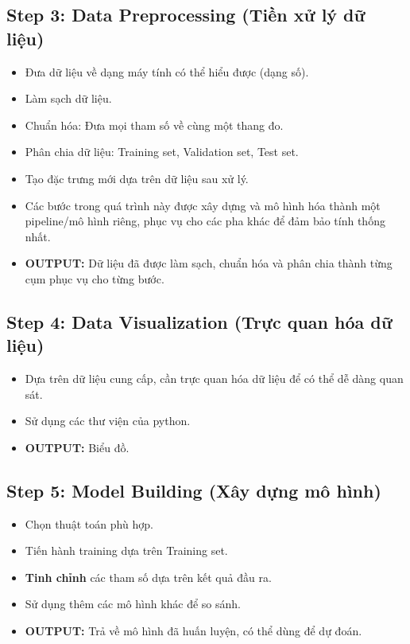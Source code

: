 \subsection{Step 3: Data Preprocessing (Tiền xử lý dữ liệu)}
\begin{itemize}
    \item Đưa dữ liệu về dạng máy tính có thể hiểu được (dạng số).
    \item Làm sạch dữ liệu.
    \item Chuẩn hóa: Đưa mọi tham số về cùng một thang đo.
    \item Phân chia dữ liệu: Training set, Validation set, Test set.
    \item Tạo đặc trưng mới dựa trên dữ liệu sau xử lý.
    \item Các bước trong quá trình này được xây dựng và mô hình hóa thành một pipeline/mô hình riêng, phục vụ cho các pha khác để đảm bảo tính thống nhất.
    \item \textbf{OUTPUT:} Dữ liệu đã được làm sạch, chuẩn hóa và phân chia thành từng cụm phục vụ cho từng bước.
\end{itemize}

\subsection{Step 4: Data Visualization (Trực quan hóa dữ liệu)}
\begin{itemize}
    \item Dựa trên dữ liệu cung cấp, cần trực quan hóa dữ liệu để có thể dễ dàng quan sát.
    \item Sử dụng các thư viện của python.
    \item \textbf{OUTPUT:} Biểu đồ.
\end{itemize}

\subsection{Step 5: Model Building (Xây dựng mô hình)}
\begin{itemize}
    \item Chọn thuật toán phù hợp.
    \item Tiến hành training dựa trên Training set.
    \item \textbf{Tinh chỉnh} các tham số dựa trên kết quả đầu ra.
    \item Sử dụng thêm các mô hình khác để so sánh.
    \item \textbf{OUTPUT:} Trả về mô hình đã huấn luyện, có thể dùng để dự đoán.
\end{itemize}

